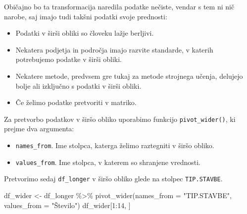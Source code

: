 \documentclass[
]{book}
\newenvironment{Shaded}{\begin{snugshade}}{\end{snugshade}}
\newcommand{\AttributeTok}[1]{\textcolor[rgb]{0.77,0.63,0.00}{#1}}
\newcommand{\DecValTok}[1]{\textcolor[rgb]{0.00,0.00,0.81}{#1}}
\newcommand{\FunctionTok}[1]{\textcolor[rgb]{0.00,0.00,0.00}{#1}}
\newcommand{\NormalTok}[1]{#1}
\newcommand{\OtherTok}[1]{\textcolor[rgb]{0.56,0.35,0.01}{#1}}
\newcommand{\SpecialCharTok}[1]{\textcolor[rgb]{0.00,0.00,0.00}{#1}}
\newcommand{\StringTok}[1]{\textcolor[rgb]{0.31,0.60,0.02}{#1}}
\providecommand{\tightlist}{%
  \setlength{\itemsep}{0pt}\setlength{\parskip}{0pt}}
\begin{document}
Običajno bo ta transformacija naredila podatke nečiste, vendar s tem ni nič narobe, saj imajo tudi takšni podatki svoje prednosti:

\begin{itemize}
\tightlist
\item
  Podatki v širši obliki so človeku lažje berljivi.
\item
  Nekatera podjetja in področja imajo razvite standarde, v katerih potrebujemo podatke v širši obliki.
\item
  Nekatere metode, predvsem gre tukaj za metode strojnega učenja, delujejo bolje ali izključno s podatki v širši obliki.
\item
  Če želimo podatke pretvoriti v matriko.
\end{itemize}

Za pretvorbo podatkov v širšo obliko uporabimo funkcijo \texttt{pivot\_wider()}, ki prejme dva argumenta:

\begin{itemize}
\tightlist
\item
  \texttt{names\_from}. Ime stolpca, katerga želimo raztegniti v širšo obliko.
\item
  \texttt{values\_from}. Ime stolpca, v katerem so shranjene vrednosti.
\end{itemize}

Pretvorimo sedaj \texttt{df\_longer} v širšo obliko glede na stolpec \texttt{TIP.STAVBE}.

\begin{Shaded}
\begin{Highlighting}[]
\NormalTok{df\_wider }\OtherTok{\textless{}{-}}\NormalTok{ df\_longer }\SpecialCharTok{\%\textgreater{}\%}
  \FunctionTok{pivot\_wider}\NormalTok{(}\AttributeTok{names\_from =} \StringTok{"TIP.STAVBE"}\NormalTok{, }\AttributeTok{values\_from =} \StringTok{"Število"}\NormalTok{)}
\NormalTok{df\_wider[}\DecValTok{1}\SpecialCharTok{:}\DecValTok{14}\NormalTok{, ]}
\end{Highlighting}
\end{Shaded}
\end{document}

